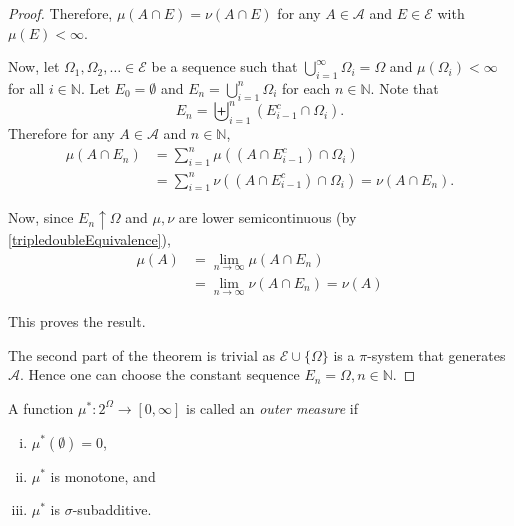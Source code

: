 \begin{proof}
    Therefore, $\mu(A\cap E)=\nu(A\cap E)$ for any $A\in\mathcal{A}$ and $E\in\mathcal{E}$ with $\mu(E)<\infty$.
    
    Now, let $\Omega_1,\Omega_2,\ldots\in\mathcal{E}$ be a sequence such that $\bigcup_{i=1}^\infty\Omega_i=\Omega$ and $\mu(\Omega_i)<\infty$ for all $i\in\mathbb{N}$. Let $E_0=\emptyset$ and $E_n=\bigcup_{i=1}^n\Omega_i$ for each $n\in\mathbb{N}$. Note that
    $$E_n=\biguplus_{i=1}^n(E_{i-1}^c\cap \Omega_i).$$
    Therefore for any $A\in\mathcal{A}$ and $n\in\mathbb{N}$,
    \begin{align*}
        \mu(A\cap E_n) &= \sum_{i=1}^n\mu((A\cap E_{i-1}^c)\cap\Omega_i) \\
        &= \sum_{i=1}^n\nu((A\cap E_{i-1}^c)\cap\Omega_i) = \nu(A\cap E_n).
    \end{align*}
    
    Now, since $E_n\uparrow\Omega$ and $\mu,\nu$ are lower semicontinuous (by \ref{tripledoubleEquivalence}),
    \begin{align*}
        \mu(A) &= \lim_{n\to\infty}\mu(A\cap E_n) \\
        &= \lim_{n\to\infty}\nu(A\cap E_n) = \nu(A)
    \end{align*}
    
    This proves the result.
    
    \vspace{2mm}
    The second part of the theorem is trivial as $\mathcal{E}\cup\{\Omega\}$ is a $\pi$-system that generates $\mathcal{A}$. Hence one can choose the constant sequence $E_n=\Omega, n\in\mathbb{N}$.
\end{proof}

\begin{definition}
    A function $\mu^*:2^\Omega\to[0,\infty]$ is called an \textit{outer measure} if
    \begin{enumerate}[(i)]
        \item $\mu^*(\emptyset)=0$,
        \item $\mu^*$ is monotone, and
        \item $\mu^*$ is $\sigma$-subadditive.
    \end{enumerate}
\end{definition}


